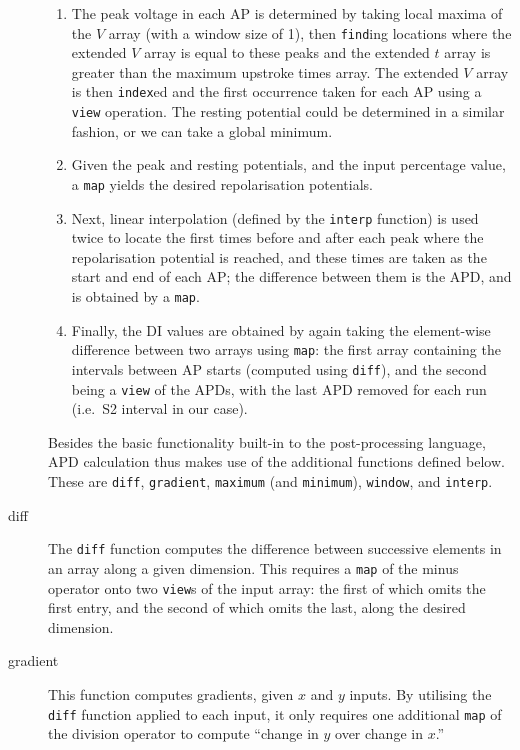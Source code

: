 \documentclass[preprint,authoryear,12pt]{elsarticle}
\newcommand{\code}[1]{\texttt{#1}}
\begin{document}
\begin{description}
\begin{enumerate}
  \item
    The peak voltage in each AP is determined by taking local maxima of the $V$ array (with a window size of 1), then \code{find}ing locations where the extended $V$ array is equal to these peaks and the extended $t$ array is greater than the maximum upstroke times array.
    The extended $V$ array is then \code{index}ed and the first occurrence taken for each AP using a \code{view} operation.
    The resting potential could be determined in a similar fashion, or we can take a global minimum.
  \item
    Given the peak and resting potentials, and the input percentage value, a \code{map} yields the desired repolarisation potentials.
  \item
    Next, linear interpolation (defined by the \code{interp} function) is used twice to locate the first times before and after each peak where the repolarisation potential is reached, and these times are taken as the start and end of each AP; the difference between them is the APD, and is obtained by a \code{map}.
  \item
    Finally, the DI values are obtained by again taking the element-wise difference between two arrays using \code{map}: the first array containing the intervals between AP starts (computed using \code{diff}), and the second being a \code{view} of the APDs, with the last APD removed for each run (i.e.\ S2 interval in our case).
  \end{enumerate}

  Besides the basic functionality built-in to the post-processing language, APD calculation thus makes use of the additional functions defined below.
  These are \code{diff}, \code{gradient}, \code{maximum} (and \code{minimum}), \code{window}, and \code{interp}.

\item[diff]
  The \code{diff} function computes the difference between successive elements in an array along a given dimension.
  This requires a \code{map} of the minus operator onto two \code{view}s of the input array: the first of which omits the first entry, and the second of which omits the last, along the desired dimension.

\item[gradient]
  This function computes gradients, given $x$ and $y$ inputs.
  By utilising the \code{diff} function applied to each input, it only requires one additional \code{map} of the division operator to compute ``change in $y$ over change in $x$.''


\end{description}
\end{document}

